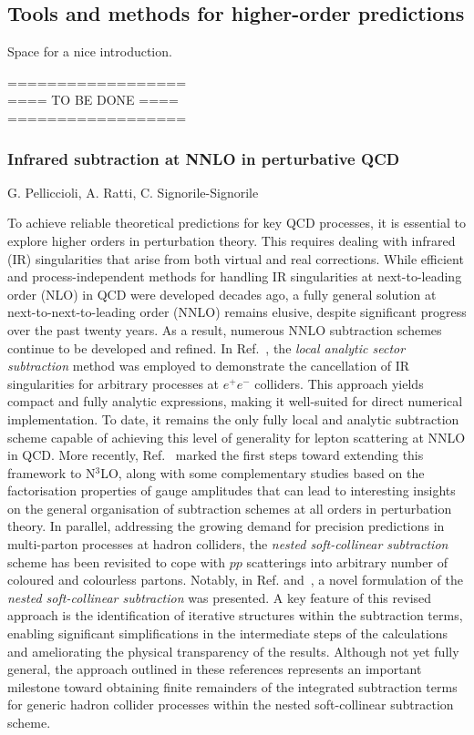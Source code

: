\documentclass{FBR_Bericht_2025}
\begin{document}
\subsection{Tools and methods for higher-order predictions}
\begin{refsection}
Space for a nice introduction.

%
{\color{red} ==================\\ ====\; TO BE DONE\; ====\\ ==================}
%
\subsubsection{Infrared subtraction at NNLO in perturbative QCD}
\begin{Namen}
G. Pelliccioli, A. Ratti, C. Signorile-Signorile
\end{Namen}
%
To achieve reliable theoretical predictions for key QCD processes, it is essential to explore higher orders in perturbation theory. This requires dealing with infrared (IR) singularities that arise from both virtual and real corrections. While efficient and process-independent methods for handling IR singularities at next-to-leading order (NLO) in QCD were developed decades ago, a fully general solution at next-to-next-to-leading order (NNLO) remains elusive, despite significant progress over the past twenty years.
As a result, numerous NNLO subtraction schemes continue to be developed and refined. In Ref.~\cite{Bertolotti:2022aih}, the \emph{local analytic sector subtraction} method was employed to demonstrate the cancellation of IR singularities for arbitrary processes at $e^+e^-$ colliders. This approach yields compact and fully analytic expressions, making it well-suited for direct numerical implementation. To date, it remains the only fully local and analytic subtraction scheme capable of achieving this level of generality for lepton scattering at NNLO in QCD.
More recently, Ref.~\cite{Magnea:2024jqg} marked the first steps toward extending this framework to N${}^3$LO, along with some complementary studies based on the factorisation properties of gauge amplitudes that can lead to interesting insights on the general organisation of subtraction schemes at all orders in perturbation theory.
In parallel, addressing the growing demand for precision predictions in multi-parton processes at hadron colliders, the \emph{nested soft-collinear subtraction} scheme has been revisited to cope with $pp$ scatterings into arbitrary number of coloured and colourless partons. Notably, in Ref.\cite{Devoto:2023rpv} and~\cite{Devoto:2025kin}, 
a novel formulation of the \emph{nested soft-collinear subtraction} was presented. 
A key feature of this revised approach is the identification of iterative structures within the subtraction terms,
enabling significant simplifications in the intermediate steps of the calculations and ameliorating the physical transparency of the results. 
Although not yet fully general, the approach outlined in these references represents an important milestone toward obtaining finite remainders of the integrated subtraction terms for generic hadron collider processes within the nested soft-collinear subtraction scheme.



\end{refsection}
\end{document}
